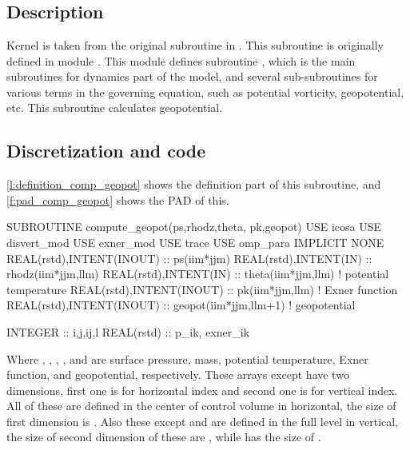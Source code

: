 \section{}

\subsection{Description}

Kernel  is taken from the original subroutine
 in \DYNAMICO.
%
This subroutine is originally defined in module .
%
This module defines subroutine , which is the main
subroutines for dynamics part of the model, and several sub-subroutines
for various terms in the governing equation, such as potential
vorticity, geopotential, etc.
%
This subroutine calculates geopotential.

\subsection{Discretization and code}

\autoref{l:definition_comp_geopot} shows the definition part of this subroutine,
and \autoref{f:pad_comp_geopot} shows the PAD of this.

\begin{LstF90}[%
caption={Definition part of \src{compute_geopot}},%
label={l:definition_comp_geopot}%
]
SUBROUTINE compute_geopot(ps,rhodz,theta, pk,geopot)
USE icosa
USE disvert_mod
USE exner_mod
USE trace
USE omp_para
IMPLICIT NONE
  REAL(rstd),INTENT(INOUT) :: ps(iim*jjm)
  REAL(rstd),INTENT(IN)    :: rhodz(iim*jjm,llm)
  REAL(rstd),INTENT(IN)    :: theta(iim*jjm,llm)    ! potential temperature
  REAL(rstd),INTENT(INOUT) :: pk(iim*jjm,llm)       ! Exner function
  REAL(rstd),INTENT(INOUT) :: geopot(iim*jjm,llm+1) ! geopotential

  INTEGER :: i,j,ij,l
  REAL(rstd) :: p_ik, exner_ik
\end{LstF90}

Where , ,
, , and  are
surface pressure, mass,
potential temperature, Exner function, and geopotential, respectively.
%
These arrays except  have two dimensions,  first one is for
horizontal index and second one is for vertical index.
%
All of these are defined in the center of control volume in horizontal,
the size of first dimension is .
%
Also these except  and  are defined in the full
level in vertical, the size of second dimension of these are ,
while  has the size of .

